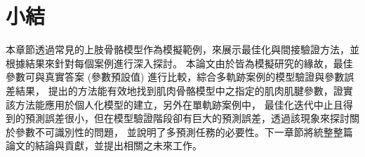\section{小結}
本章節透過常見的上肢骨骼模型作為模擬範例，來展示最佳化與間接驗證方法，並根據結果來針對每個案例進行深入探討。
本論文由於皆為模擬研究的緣故，最佳參數可與真實答案 (參數預設值) 進行比較，綜合多軌跡案例的模型驗證與參數誤差結果，
提出的方法能有效地找到肌肉骨骼模型中之指定的肌肉肌腱參數，證實該方法能應用於個人化模型的建立，另外在單軌跡案例中，
最佳化迭代中止且得到的預測誤差很小，但在模型驗證階段卻有巨大的預測誤差，透過該現象來探討關於參數不可識別性的問題，
並說明了多預測任務的必要性。下一章節將統整整篇論文的結論與貢獻，並提出相關之未來工作。

\clearpage